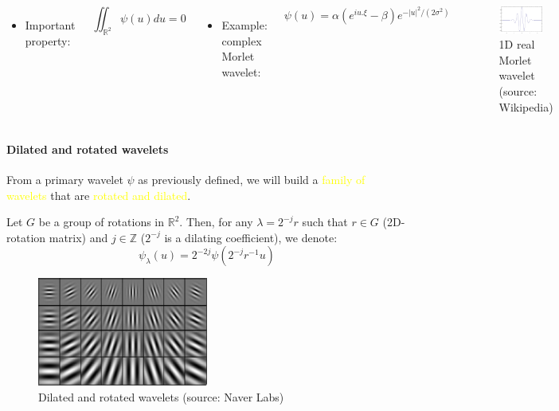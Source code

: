 \documentclass[10pt]{beamer}
\newcommand{\mathZ}{\mathbb{Z}}
\newcommand{\mathR}{\mathbb{R}}
\newcommand{\col}{\textcolor{yellow}}
\begin{document}
\begin{darkframes}
\begin{frame}[label=def_wavelet]{\subsecname}
    \begin{columns}
            \begin{itemize}
                \item Important property:
            \end{itemize}
            $$\iint_{\mathR^2} \psi(u) du = 0$$
            \begin{itemize}
                \item Example: complex Morlet wavelet:
            \end{itemize}
            $$\psi(u) = \alpha (e^{iu.\xi} - \beta) e^{-|u|^2/(2\sigma^2)}$$
            \begin{figure}
            \centering
            \includegraphics[width=0.8\textwidth]{resources/wavelets/360px-MorletWaveletMathematica.png}
            \caption{1D real Morlet wavelet (source: Wikipedia)}
            \end{figure}
    \end{columns}
    \end{frame}
    
    
    \begin{frame}[label=dil_rot_wavelet]{\subsecname}
    \framesubtitle{Dilated and rotated wavelets}
    From a primary wavelet $\psi$ as previously defined, we will build a \col{family of wavelets} that are \col{rotated and dilated}.
    
    Let $G$ be a group of rotations in $\mathR^2$. Then, for any $\lambda = 2^{-j} r$ such that $r \in G$ (2D-rotation matrix) and $j \in \mathZ$ ($2^{-j}$ is a dilating coefficient), we denote:
    $$\psi_\lambda(u) = 2^{-2j} \psi(2^{-j} r^{-1} u)$$
    \begin{figure}
        \centering
        \includegraphics[width=0.5\textwidth]{resources/wavelets/Dilates_rotated_wavelets.jpg}
        \caption{Dilated and rotated wavelets (source: Naver Labs)}
    \end{figure}
    \end{frame}
    

\end{darkframes}
\end{document}

